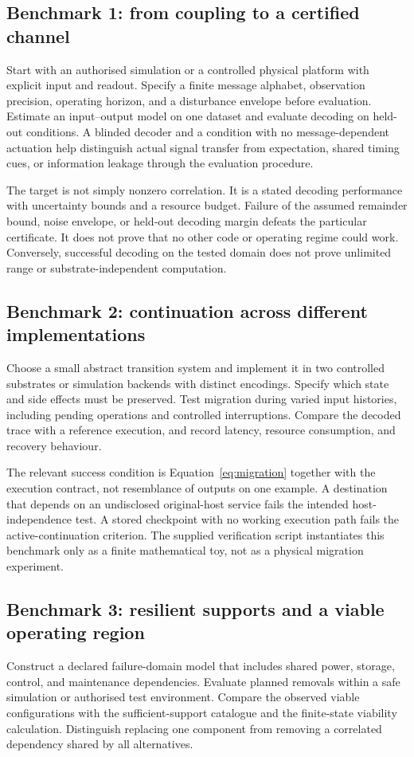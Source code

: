 \documentclass[11pt,a4paper]{article}
\theoremstyle{definition}
\theoremstyle{remark}
\begin{document}
\subsection{Benchmark 1: from coupling to a certified channel}
Start with an authorised simulation or a controlled physical platform with explicit input and readout. Specify a finite message alphabet, observation precision, operating horizon, and a disturbance envelope before evaluation. Estimate an input--output model on one dataset and evaluate decoding on held-out conditions. A blinded decoder and a condition with no message-dependent actuation help distinguish actual signal transfer from expectation, shared timing cues, or information leakage through the evaluation procedure.

The target is not simply nonzero correlation. It is a stated decoding performance with uncertainty bounds and a resource budget. Failure of the assumed remainder bound, noise envelope, or held-out decoding margin defeats the particular certificate. It does not prove that no other code or operating regime could work. Conversely, successful decoding on the tested domain does not prove unlimited range or substrate-independent computation.

\subsection{Benchmark 2: continuation across different implementations}
Choose a small abstract transition system and implement it in two controlled substrates or simulation backends with distinct encodings. Specify which state and side effects must be preserved. Test migration during varied input histories, including pending operations and controlled interruptions. Compare the decoded trace with a reference execution, and record latency, resource consumption, and recovery behaviour.

The relevant success condition is Equation~\eqref{eq:migration} together with the execution contract, not resemblance of outputs on one example. A destination that depends on an undisclosed original-host service fails the intended host-independence test. A stored checkpoint with no working execution path fails the active-continuation criterion. The supplied verification script instantiates this benchmark only as a finite mathematical toy, not as a physical migration experiment.

\subsection{Benchmark 3: resilient supports and a viable operating region}
Construct a declared failure-domain model that includes shared power, storage, control, and maintenance dependencies. Evaluate planned removals within a safe simulation or authorised test environment. Compare the observed viable configurations with the sufficient-support catalogue and the finite-state viability calculation. Distinguish replacing one component from removing a correlated dependency shared by all alternatives.
\end{document}
